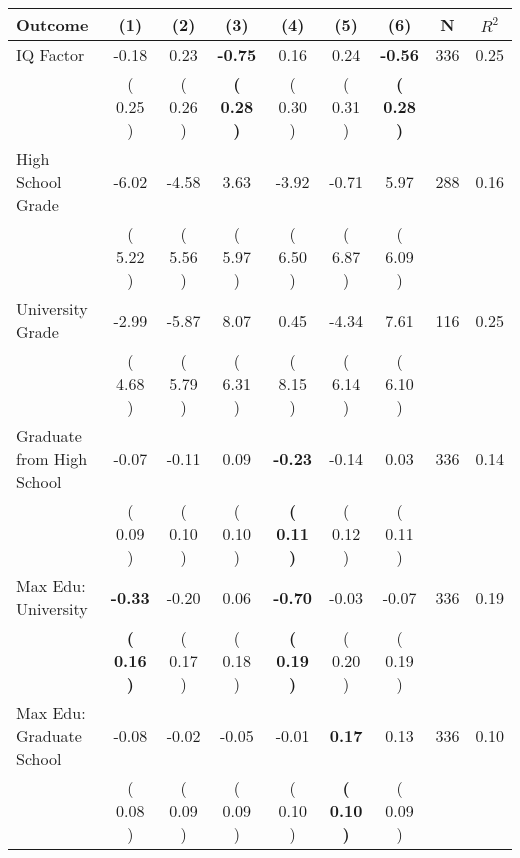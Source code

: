 \begin{tabular}{lcccccccc}
\toprule
 \textbf{Outcome} & \textbf{(1)} & \textbf{(2)} & \textbf{(3)} & \textbf{(4)} & \textbf{(5)} & \textbf{(6)} & \textbf{N} & \textbf{$ R^2$} \\
\midrule
IQ Factor &     -0.18 &      0.23 & \textbf{    -0.75} &      0.16 &      0.24 & \textbf{    -0.56} & 336 &       0.25 \\ 
 & (     0.25 ) & (     0.26 ) & \textbf{(     0.28 )} & (     0.30 ) & (     0.31 ) & \textbf{(     0.28 )} & \\
High School Grade &     -6.02 &     -4.58 &      3.63 &     -3.92 &     -0.71 &      5.97 & 288 &       0.16 \\ 
 & (     5.22 ) & (     5.56 ) & (     5.97 ) & (     6.50 ) & (     6.87 ) & (     6.09 ) & \\
University Grade &     -2.99 &     -5.87 &      8.07 &      0.45 &     -4.34 &      7.61 & 116 &       0.25 \\ 
 & (     4.68 ) & (     5.79 ) & (     6.31 ) & (     8.15 ) & (     6.14 ) & (     6.10 ) & \\
Graduate from High School &     -0.07 &     -0.11 &      0.09 & \textbf{    -0.23} &     -0.14 &      0.03 & 336 &       0.14 \\ 
 & (     0.09 ) & (     0.10 ) & (     0.10 ) & \textbf{(     0.11 )} & (     0.12 ) & (     0.11 ) & \\
Max Edu: University & \textbf{    -0.33} &     -0.20 &      0.06 & \textbf{    -0.70} &     -0.03 &     -0.07 & 336 &       0.19 \\ 
 & \textbf{(     0.16 )} & (     0.17 ) & (     0.18 ) & \textbf{(     0.19 )} & (     0.20 ) & (     0.19 ) & \\
Max Edu: Graduate School &     -0.08 &     -0.02 &     -0.05 &     -0.01 & \textbf{     0.17} &      0.13 & 336 &       0.10 \\ 
 & (     0.08 ) & (     0.09 ) & (     0.09 ) & (     0.10 ) & \textbf{(     0.10 )} & (     0.09 ) & \\
\bottomrule
\end{tabular}
